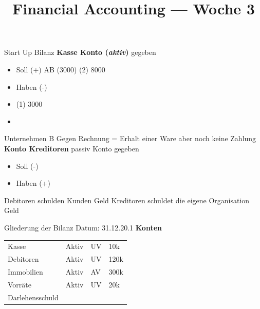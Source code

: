 \documentclass[a4paper]{article}
\title{Financial Accounting — Woche 3}
\begin{document}
    \maketitle
     Start Up Bilanz
    \textbf{Kasse Konto (\textit{aktiv})} gegeben
        \begin{itemize}
            \item Soll (+)
                \subitem AB (3000) 
                \subitem (2) 8000
            \item Haben (-)
            \item (1) 3000
            \item 
        \end{itemize}
     Unternehmen B
        Gegen Rechnung = Erhalt einer Ware aber noch keine Zahlung
        \textbf{Konto Kreditoren} passiv Konto gegeben
        \begin{itemize}
            \item Soll (-)
                \subitem  
            \item Haben (+)
                \subitem  
        \end{itemize}

        Debitoren schulden Kunden Geld
        Kreditoren schuldet die eigene Organisation Geld

     Gliederung der Bilanz \linebreak
    Datum: 31.12.20.1 \linebreak
    \textbf{Konten}
    \begin{table}[]
        \begin{tabular}{llll}
            Kasse & Aktiv & UV & 10k \\
            Debitoren & Aktiv  & UV & 120k \\
            Immobilien & Aktiv  &  AV & 300k  \\
            Vorräte & Aktiv & UV  &  20k \\
            Darlehensschuld
        \end{tabular}
    \end{table}
    
\end{document}
